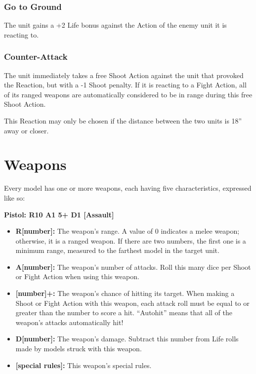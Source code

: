 \begin{multicols}{2}
\subsection*{Go to Ground}
The unit gains a +2 Life bonus against the Action of the enemy unit it is reacting to.



\subsection*{Counter-Attack}
The unit immediately takes a free Shoot Action against the unit that provoked the Reaction, but with a -1 Shoot penalty. If it is reacting to a Fight Action, all of its ranged weapons are automatically considered to be in range during this free Shoot Action.

This Reaction may only be chosen if the distance between the two units is 18'' away or closer.




\chapter*{Weapons}

Every model has one or more weapons, each having five characteristics, expressed like so:

\textbf{Pistol: R10 A1 5+ D1 [Assault]}

\begin{itemize}
    \item \textbf{R[number]:} The weapon's range. A value of 0 indicates a melee weapon; otherwise, it is a ranged weapon. If there are two numbers, the first one is a minimum range, measured to the farthest model in the target unit.
    \item \textbf{A[number]:} The weapon's number of attacks. Roll this many dice per Shoot or Fight Action when using this weapon.
    \item \textbf{[number]+:} The weapon's chance of hitting its target. When making a Shoot or Fight Action with this weapon, each attack roll must be equal to or greater than the number to score a hit. ``Autohit'' means that all of the weapon's attacks automatically hit!
    \item \textbf{D[number]:} The weapon's damage. Subtract this number from Life rolls made by models struck with this weapon.
    \item \textbf{[special rules]:} This weapon's special rules.
\end{itemize}





\end{multicols}
